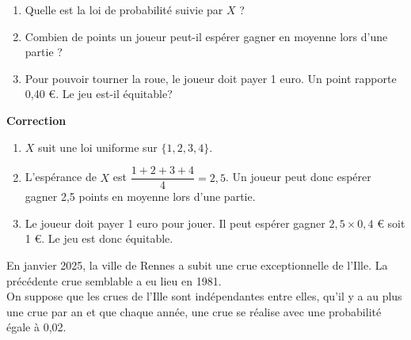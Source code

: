 \documentclass[a4paper,11pt,exos]{nsi} %
\begin{document}
\maketitle






{
}
\begin{enumerate}
    \item Quelle est la loi de probabilité suivie par $X$ ?
    \item Combien de points un joueur peut-il espérer gagner en moyenne lors d'une partie ?
    \item Pour pouvoir tourner la roue, le joueur doit payer 1 euro. Un point rapporte 0,40 €. Le jeu est-il équitable?
\end{enumerate}

\textcolor{UGLiBlue}{\textbf{Correction}
\begin{enumerate}
    \item $X$ suit une loi uniforme sur $\{1,2,3,4\}$.
    \item L'espérance de $X$ est $\dfrac{1+2+3+4}{4}=2,5$. Un joueur peut donc espérer gagner 2,5 points en moyenne lors d'une partie.
    \item Le joueur doit payer 1 euro pour jouer. Il peut espérer gagner $2,5\times 0,4$ € soit 1 €. Le jeu est donc équitable.
\end{enumerate}}


\exo{}
En janvier 2025, la ville de Rennes a subit une crue exceptionnelle de l'Ille. La précédente crue semblable a eu lieu en 1981.\\
On suppose que les crues de l'Ille sont indépendantes entre elles, qu'il y a au plus une crue par an et que chaque année, une crue se réalise avec une probabilité égale à 0,02.
\end{document}
